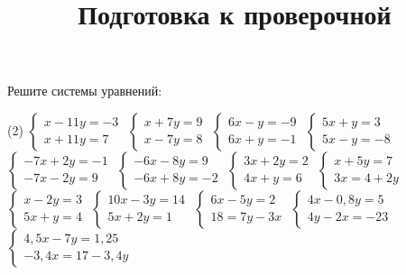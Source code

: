 \begin{class}[number=7]
	\title{Подготовка к проверочной}
	\begin{listofex}
		\item Решите системы уравнений: %
		\begin{tasks}(2)
			\task \( \begin{cases} x-11y=-3 \\ x+11y=7 \end{cases} \)
			\task \( \begin{cases} x+7y=9 \\ x-7y=8 \end{cases} \)
			\task \( \begin{cases} 6x-y=-9 \\ 6x+y=-1 \end{cases} \)
			\task \( \begin{cases} 5x+y=3 \\ 5x-y=-8 \end{cases} \)
			\task \( \begin{cases} -7x+2y=-1 \\ -7x-2y=9 \end{cases} \)
			\task \( \begin{cases} -6x-8y=9 \\ -6x+8y=-2 \end{cases} \)
			\task \( \begin{cases} 3x+2y=2 \\ 4x+y=6 \end{cases} \)
			\task \( \begin{cases} x+5y=7 \\ 3x=4+2y \end{cases} \)
			\task \( \begin{cases} x-2y=3 \\ 5x+y=4 \end{cases} \)
			\task \( \begin{cases} 10x-3y=14 \\ 5x+2y=1 \end{cases} \)
			\task \( \begin{cases} 6x-5y=2 \\ 18=7y-3x \end{cases} \)
			\task \( \begin{cases} 4x-0,8y=5 \\ 4y-2x=-23 \end{cases} \)
			\task \( \begin{cases} 4,5x-7y=1,25 \\ -3,4x=17-3,4y \end{cases} \)

\end{tasks}
\end{listofex}
\end{class}
